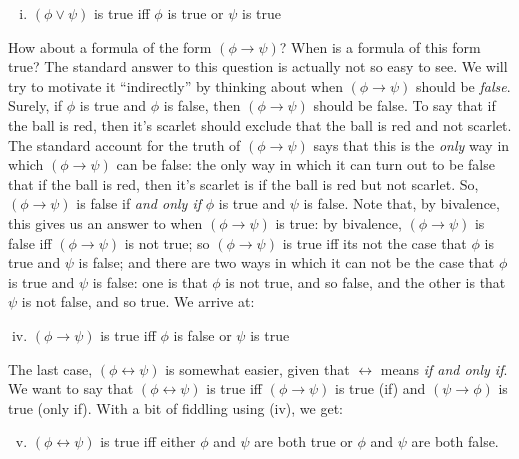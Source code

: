 \begin{enumerate}[\thesection.1]
\begin{enumerate}[(i)]
				\item $(\phi\lor\psi)$ is true iff $\phi$ is true or $\psi$ is true							
				\end{enumerate}
		How about a formula of the form $(\phi\to\psi)$? When is a formula of this form true? The standard answer to this question is actually not so easy to see. We will try to motivate it ``indirectly'' by thinking about when $(\phi\to\psi)$ should be \emph{false}. Surely, if $\phi$ is true and $\phi$ is false, then $(\phi\to\psi)$ should be false. To say that if the ball is red, then it's scarlet should exclude that the ball is red and not scarlet. The standard account for the truth of $(\phi\to\psi)$ says that this is the \emph{only} way in which $(\phi\to\psi)$ can be false: the only way in which it can turn out to be false that if the ball is red, then it's scarlet is if the ball is red but not scarlet. So, $(\phi\to\psi)$ is false if \emph{and only if} $\phi$ is true and $\psi$ is false. 		
		Note that, by bivalence, this gives us an answer to when $(\phi\to\psi)$ is true: by bivalence, $(\phi\to\psi)$ is false iff $(\phi\to\psi)$ is not true; so $(\phi\to\psi)$ is true iff its not the case that $\phi$ is true and $\psi$ is false; and there are two ways in which it can not be the case that $\phi$ is true and $\psi$ is false: one is that $\phi$ is not true, and so false, and the other is that $\psi$ is not false, and so true. We arrive at:
				\begin{enumerate}[(i)]
				\setcounter{enumii}{3}	
				\item $(\phi\to\psi)$ is true iff $\phi$ is false or $\psi$ is true							
				\end{enumerate}
The last case, $(\phi\leftrightarrow\psi)$ is somewhat easier, given that $\leftrightarrow$ means \emph{if and only if}. We want to say that $(\phi\leftrightarrow\psi)$ is true iff $(\phi\to\psi)$ is true (if) and $(\psi\to\phi)$ is true (only if). With a bit of fiddling using (iv), we get:
 		\begin{enumerate}[(i)]
				\setcounter{enumii}{4}	
				\item $(\phi\leftrightarrow\psi)$ is true iff either $\phi$ and $\psi$ are both true or $\phi$ and $\psi$ are both false.			
		\end{enumerate} 		
		

\end{enumerate}
